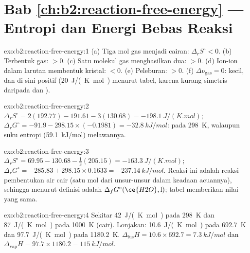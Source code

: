 \section*{Bab \ref{ch:b2:reaction-free-energy} --- Entropi dan Energi Bebas Reaksi}

\begin{solution}{exo:b2:reaction-free-energy:1}
(a) Tiga mol gas menjadi cairan: $\Delta_r S^\circ < 0$. (b) Terbentuk gas:
$> 0$. (c) Satu molekul gas menghasilkan dua: $> 0$. (d) Ion-ion dalam
larutan membentuk kristal: $< 0$. (e) Peleburan: $> 0$. (f)
$\Delta\nu_{\text{gas}} = 0$: kecil, dan di sini positif
(\qty{+20}{J/(K.mol)} menurut tabel, karena  kurang simetris
daripada  dan ).
\end{solution}

\begin{solution}{exo:b2:reaction-free-energy:2}
$\Delta_r S^\circ = 2(192.77) - 191.61 - 3(130.68) = \qty{-198.1}{J/(K.mol)}$;
$\Delta_r G^\circ = -91.9 - 298.15 \times (-0.1981) = \qty{-32.8}{kJ/mol}$:
 pada \qty{298}{K}, walaupun suku entropi (\qty{+59.1}{kJ/mol})
melawannya.
\end{solution}

\begin{solution}{exo:b2:reaction-free-energy:3}
$\Delta_r S^\circ = 69.95 - 130.68 - \tfrac12(205.15) = \qty{-163.3}{J/(K.mol)}$;
$\Delta_r G^\circ = -285.83 + 298.15 \times 0.1633 = \qty{-237.14}{kJ/mol}$.
Reaksi ini adalah reaksi pembentukan air cair (satu mol dari unsur-unsur
dalam keadaan acuannya), sehingga  menurut
definisi adalah $\Delta_f G^\circ(\ce{H2O}, \text{l})$; tabel memberikan
nilai yang sama.
\end{solution}

\begin{solution}{exo:b2:reaction-free-energy:4}
Sekitar \qty{42}{J/(K.mol)} pada \qty{298}{K} dan \qty{87}{J/(K.mol)} pada
\qty{1000}{K} (cair). Lonjakan: \qty{10.6}{J/(K.mol)} pada \qty{692.7}{K}
dan \qty{97.7}{J/(K.mol)} pada \qty{1180.2}{K}. $\Delta_{\text{fus}}H = 10.6 \times
692.7 = \qty{7.3}{kJ/mol}$ dan $\Delta_{\text{vap}}H = 97.7 \times 1180.2 =
\qty{115}{kJ/mol}$.
\end{solution}

